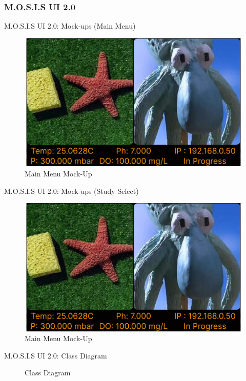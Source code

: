 \documentclass[17pt, aspectratio=169]{beamer}
\begin{document}
\subsubsection{M.O.S.I.S UI 2.0}
\begin{frame}{M.O.S.I.S UI 2.0: Mock-ups (Main Menu)}
	\begin{figure}
		\includegraphics[page=1,height=0.65\textheight]{../../Progress_Report_Document/Appendix/Design_Documentation/User_Interface/Figures/M.O.S.I.S_UI_Design.pdf}
		\caption{Main Menu Mock-Up}
	\end{figure}
\end{frame}
\begin{frame}{M.O.S.I.S UI 2.0: Mock-ups (Study Select)}
	\begin{figure}
		\includegraphics[page=2,height=0.65\textheight]{../../Progress_Report_Document/Appendix/Design_Documentation/User_Interface/Figures/M.O.S.I.S_UI_Design.pdf}
		\caption{Main Menu Mock-Up}
	\end{figure}
\end{frame}
\begin{frame}{M.O.S.I.S UI 2.0: Class Diagram}
	\begin{figure}
		\caption{Class Diagram}
	\end{figure}
\end{frame}
\end{document}

